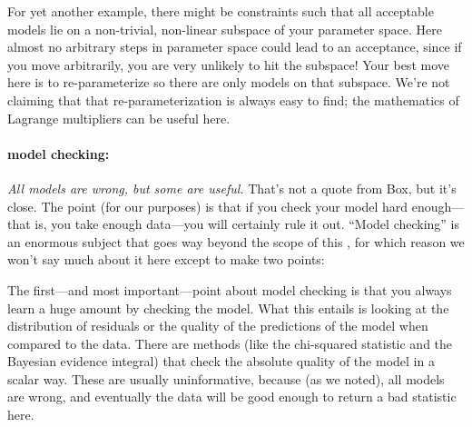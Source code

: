 \documentclass[modern]{aastex61}
\begin{document}
For yet another example, there might be constraints such that all
acceptable models lie on a non-trivial, non-linear subspace of your
parameter space.
Here almost no arbitrary steps in parameter space could lead to an
acceptance, since if you move arbitrarily, you are very unlikely to
hit the subspace!
Your best move here is to re-parameterize so there are only models on
that subspace.
We're not claiming that that re-parameterization is always easy to
find; the mathematics of Lagrange multipliers can be useful here.

\paragraph{model checking:}
\emph{All models are wrong, but some are useful.}
That's not a quote from Box, but it's close.
The point (for our purposes) is that if you check your model hard
enough---that is, you take enough data---you will certainly rule it
out.
``Model checking'' is an enormous subject that goes way beyond the
scope of this \documentname, for which reason we won't say much about
it here except to make two points:

The first---and most important---point about model checking is that
you always learn a huge amount by checking the model.
What this entails is looking at the distribution of residuals or the
quality of the predictions of the model when compared to the data.
There are methods (like the chi-squared statistic and the Bayesian
evidence integral) that check the absolute quality of the model in a
scalar way.
These are usually uninformative, because (as we noted), all models are
wrong, and eventually the data will be good enough to return a bad
statistic here.
\end{document}
